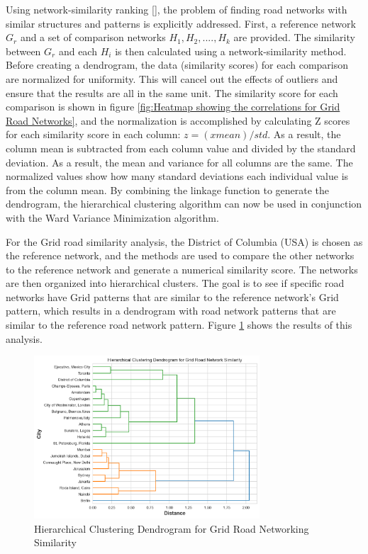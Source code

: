 Using network-similarity ranking [\cite{Soundarajan:2014}], the problem of finding road networks with similar structures and patterns is explicitly addressed. First, a reference network $G_r$ and a set of comparison networks $H_1, H_2,...., H_k$ are provided. The similarity between $G_r$ and each $H_i$ is then calculated using a network-similarity method. Before creating a dendrogram, the data (similarity scores) for each comparison are normalized for uniformity. This will cancel out the effects of outliers and ensure that the results are all in the same unit. The similarity score for each comparison is shown in figure \ref{fig:Heatmap showing the correlations for Grid Road Networks}, and the normalization is accomplished by calculating Z scores for each similarity score in each column: $z = (x mean)/std$. As a result, the column mean is subtracted from each column value and divided by the standard deviation. As a result, the mean and variance for all columns are the same. The normalized values show how many standard deviations each individual value is from the column mean. By combining the linkage function to generate the dendrogram, the hierarchical clustering algorithm can now be used in conjunction with the Ward Variance Minimization algorithm.

For the Grid road similarity analysis, the District of Columbia (USA) is chosen as the reference network, and the methods are used to compare the other networks to the reference network and generate a numerical similarity score. The networks are then organized into hierarchical clusters. The goal is to see if specific road networks have Grid patterns that are similar to the reference network's Grid pattern, which results in a dendrogram with road network patterns that are similar to the reference road network pattern. Figure \ref{fig:Hierarchical Clustering Dendrogram for Grid Road Networking Similarity} shows the results of this analysis.

\begin{figure}[!ht]
\centering
\includegraphics[width=0.75\textwidth,center]{picture/Grid/grid_dendrogram2.png}
\caption[Hierarchical Clustering Dendrogram for Grid Road Networking Similarity]{Hierarchical Clustering Dendrogram for Grid Road Networking Similarity}
\label{fig:Hierarchical Clustering Dendrogram for Grid Road Networking Similarity}
\end{figure}

